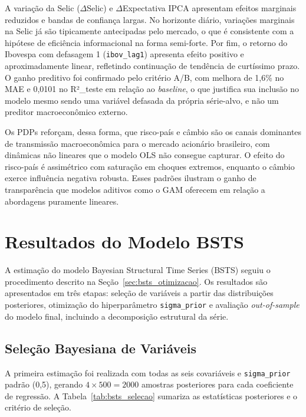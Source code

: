 \documentclass[	12pt, Times, openright, oneside, a4paper, english, brazil]{abntex2}
\begin{document}
A variação da Selic ($\Delta$Selic) e $\Delta$Expectativa IPCA apresentam efeitos marginais reduzidos e bandas de confiança largas. No horizonte diário, variações marginais na Selic já são tipicamente antecipadas pelo mercado, o que é consistente com a hipótese de eficiência informacional na forma semi-forte. Por fim, o retorno do Ibovespa com defasagem 1 (\texttt{ibov\_lag1}) apresenta efeito positivo e aproximadamente linear, refletindo continuação de tendência de curtíssimo prazo. O ganho preditivo foi confirmado pelo critério A/B, com melhora de 1{,}6\% no MAE e 0{,}0101 no R²\_teste em relação ao \textit{baseline}, o que justifica sua inclusão no modelo mesmo sendo uma variável defasada da própria série-alvo, e não um preditor macroeconômico externo.

Os PDPs reforçam, dessa forma, que risco-país e câmbio são os canais dominantes de transmissão macroeconômica para o mercado acionário brasileiro, com dinâmicas não lineares que o modelo OLS não consegue capturar. O efeito do risco-país é assimétrico com saturação em choques extremos, enquanto o câmbio exerce influência negativa robusta. Esses padrões ilustram o ganho de transparência que modelos aditivos como o GAM oferecem em relação a abordagens puramente lineares.

\section{Resultados do Modelo BSTS}\label{sec:resultados_bsts}

A estimação do modelo Bayesian Structural Time Series (BSTS) seguiu o procedimento descrito na Seção~\ref{sec:bsts_otimizacao}. Os resultados são apresentados em três etapas: seleção de variáveis a partir das distribuições posteriores, otimização do hiperparâmetro \texttt{sigma\_prior} e avaliação \textit{out-of-sample} do modelo final, incluindo a decomposição estrutural da série.

\subsection{Seleção Bayesiana de Variáveis}

A primeira estimação foi realizada com todas as seis covariáveis e \texttt{sigma\_prior} padrão (0,5), gerando $4 \times 500 = 2000$ amostras posteriores para cada coeficiente de regressão. A Tabela~\ref{tab:bsts_selecao} sumariza as estatísticas posteriores e o critério de seleção.
\end{document}
